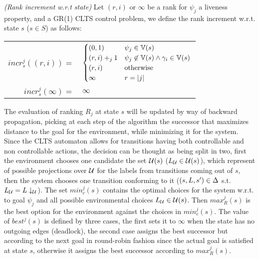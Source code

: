 \begin{definition}\label{def:gr1_rank_state_increment} \emph{(Rank increment w.r.t state)} 
	Let $(r,i)$ or $\infty$ be a rank for $\psi_j$ a liveness property, and \controlProblemDef a GR(1) CLTS control problem, we define the rank increment w.r.t. state $s$ ($s \in S$) as follows:
	\begin{center}
		\begin{tabular}{r l}
			$incr_s^j((r,i)) = $ & $\begin{cases}
			(0,1) & \psi_j \in \mathbb{V}(s)\\
			(r,i)+_j 1 & \psi_j \not\in \mathbb{V}(s) \wedge \gamma_i \in \mathbb{V}(s)\\			
			(r,i) & \text{otherwise}\\
			\infty & r = |j|
			\end{cases}$\\
			$incr_s^j(\infty) = $ & $\infty$\\
		\end{tabular}
	\end{center}
\end{definition}

The evaluation of ranking $R_j$ at state $s$ will be updated by way of backward propagation, picking at each step of the algorithm the successor that maximizes distance to the goal for the environment, while minimizing it for the system. Since the CLTS automaton allows for transitions having both controllable and non controllable actions, the decision can be thought as being split in two, first the environment chooses one candidate the set $\mathcal{U}(s)$ ($L_{\mathcal{U}} \in \mathcal{U}(s)$), which represent of possible projections over $\mathcal{U}$ for the labels from transitions coming out of $s$, then the system chooses one transition conforming to it ($(s,L, s') \in \Delta$ s.t. $L_{\mathcal{U}} = L\downarrow_{\mathcal{U}}$). The set $min_c^j(s)$ contains the optimal choices for the system w.r.t. to goal $\psi_j$ and all possible environmental choices $L_{\mathcal{U}} \in \mathcal{U}(s)$. Then $max_R^j(s)$ is the best option for the environment against the choices in $min_c^j(s)$.  The value of $best^j(s)$ is defined by three cases, the first sets it to $\infty$ when the state has no outgoing edges (deadlock), the second case assigns the best successor but according to the next goal in round-robin fashion since the actual goal is satisfied at state $s$, otherwise it assigns the best successor according to $max_R^j(s)$.

